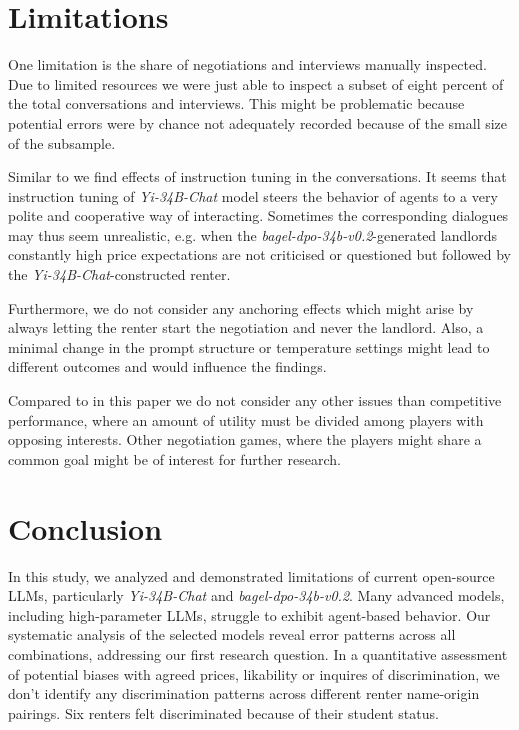\documentclass[runningheads]{llncs}
\begin{document}
\section{Limitations}

One limitation is the share of negotiations and interviews manually inspected. Due to limited resources we were just able to inspect a subset of eight percent of the total conversations and interviews. This might be problematic because potential errors were by chance not adequately recorded because of the small size of the subsample.

Similar to \cite[p.17]{park_generative_2023} we find effects of instruction tuning in the conversations. It seems that instruction tuning of \textit{Yi-34B-Chat} model steers the behavior of agents to a very polite and cooperative way of interacting. Sometimes the corresponding dialogues may thus seem unrealistic, e.g. when the \textit{bagel-dpo-34b-v0.2}-generated landlords constantly high price expectations are not criticised or questioned but followed by the \textit{Yi-34B-Chat}-constructed renter.

Furthermore, we do not consider any anchoring effects which might arise by always letting the renter start the negotiation and never the landlord. Also, a minimal change in the prompt structure or temperature settings might lead to different outcomes and would influence the findings.

Compared to \cite{davidson_evaluating_2024} in this paper we do not consider any other issues than competitive performance, where an amount of utility must be divided among players with opposing interests. Other negotiation games, where the players might share a common goal might be of interest for further research.


\section{Conclusion}
In this study, we analyzed and demonstrated limitations of current open-source LLMs, particularly \textit{Yi-34B-Chat} and \textit{bagel-dpo-34b-v0.2}. Many advanced models, including high-parameter LLMs, struggle to exhibit agent-based behavior. Our systematic analysis of the selected models reveal error patterns across all combinations, addressing our first research question. In a quantitative assessment of potential biases with agreed prices, likability or inquires of discrimination, we don't identify any discrimination patterns across different renter name-origin pairings. Six renters felt discriminated because of their student status.
\end{document}
